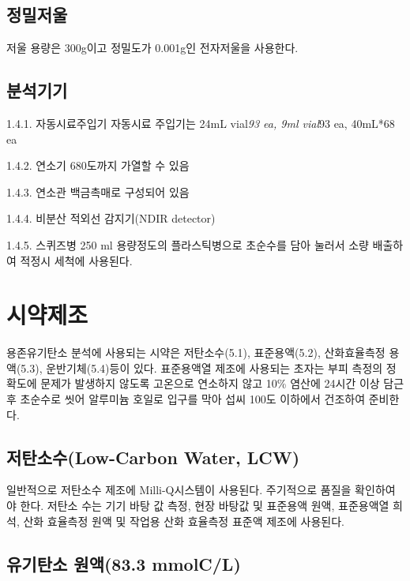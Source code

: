 \documentclass[
]{book}
\begin{document}
\hypertarget{uxc815uxbc00uxc800uxc6b8-1}{%
\subsection{정밀저울}\label{uxc815uxbc00uxc800uxc6b8-1}}

저울 용량은 300g이고 정밀도가 0.001g인 전자저울을 사용한다.

\hypertarget{uxbd84uxc11duxae30uxae30-2}{%
\subsection{분석기기}\label{uxbd84uxc11duxae30uxae30-2}}

1.4.1. 자동시료주입기
자동시료 주입기는 24mL vial\emph{93 ea, 9ml vial}93 ea, 40mL*68 ea

1.4.2. 연소기
680도까지 가열할 수 있음

1.4.3. 연소관
백금촉매로 구성되어 있음

1.4.4. 비분산 적외선 감지기(NDIR detector)

1.4.5. 스퀴즈병
250 ml 용량정도의 플라스틱병으로 초순수를 담아 눌러서 소량 배출하여 적정시 세척에 사용된다.

\hypertarget{uxc2dcuxc57duxc81cuxc870-5}{%
\section{시약제조}\label{uxc2dcuxc57duxc81cuxc870-5}}

용존유기탄소 분석에 사용되는 시약은 저탄소수(5.1), 표준용액(5.2), 산화효율측정 용액(5.3), 운반기체(5.4)등이 있다. 표준용액열 제조에 사용되는 초자는 부피 측정의 정확도에 문제가 발생하지 않도록 고온으로 연소하지 않고 10\% 염산에 24시간 이상 담근 후 초순수로 씻어 알루미늄 호일로 입구를 막아 섭씨 100도 이하에서 건조하여 준비한다.

\hypertarget{uxc800uxd0c4uxc18cuxc218low-carbon-water-lcw}{%
\subsection{저탄소수(Low-Carbon Water, LCW)}\label{uxc800uxd0c4uxc18cuxc218low-carbon-water-lcw}}

일반적으로 저탄소수 제조에 Milli-Q시스템이 사용된다. 주기적으로 품질을 확인하여야 한다. 저탄소 수는 기기 바탕 값 측정, 현장 바탕값 및 표준용액 원액, 표준용액열 희석, 산화 효율측정 원액 및 작업용 산화 효율측정 표준액 제조에 사용된다.

\hypertarget{uxc720uxae30uxd0c4uxc18c-uxc6d0uxc56183.3-mmolcl}{%
\subsection{유기탄소 원액(83.3 mmolC/L)}\label{uxc720uxae30uxd0c4uxc18c-uxc6d0uxc56183.3-mmolcl}}
\end{document}
